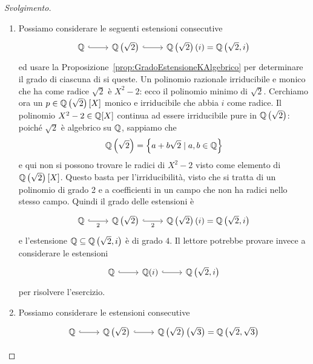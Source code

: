 \begin{proof}[Svolgimento]
\begin{enumerate}
\item Possiamo considerare le seguenti estensioni consecutive
\[\begin{tikzcd}
\Q \ar[r, hookrightarrow] & \Q\left(\sqrt 2\right) \ar[r, hookrightarrow] &  \Q\left(\sqrt 2\right)(i) = \Q\left(\sqrt 2, i\right)
\end{tikzcd}\]
ed usare la Proposizione~\ref{prop:GradoEstensioneKAlgebrico} per determinare il grado di ciascuna di si queste. Un polinomio razionale irriducibile e monico che ha come radice \(\sqrt2\) è \(X^2-2\): ecco il polinomio minimo di \(\sqrt2\). Cerchiamo ora un \(p \in \mathbb{Q}\left(\sqrt2\right) [X]\) monico e irriducibile che abbia \(i\) come radice. Il polinomio \(X^2-2 \in \mathbb{Q}[X]\) continua ad essere irriducibile pure in \(\mathbb{Q}\left(\sqrt2\right)\): poiché \(\sqrt 2\) è algebrico su \(\mathbb{Q}\), sappiamo che
\[\mathbb{Q}\left(\sqrt2\right) = \left\{ a+b\sqrt2 \mid a, b \in \mathbb{Q} \right\}\]
e qui non si possono trovare le radici di \(X^2-2\) visto come elemento di \(\mathbb{Q}\left(\sqrt2\right)[X]\). Questo basta per l'irriducibilità, visto che si tratta di un polinomio di grado 2 e a coefficienti in un campo che non ha radici nello stesso campo. Quindi il grado delle estensioni è
\[\begin{tikzcd}
\Q \ar["2", r, hookrightarrow, swap] & \Q\left(\sqrt 2\right) \ar["2", r, hookrightarrow, swap] &  \Q\left(\sqrt 2\right)(i) = \Q\left(\sqrt 2, i\right)
\end{tikzcd}\]
e l'estensione \(\mathbb{Q} \subseteq \mathbb{Q}\left(\sqrt 2, i\right)\) è di grado \(4\).
Il lettore potrebbe provare invece a considerare le estensioni
\[\begin{tikzcd}
\Q \ar[r, hookrightarrow] & \Q(i) \ar[r, hookrightarrow] & \Q\left(\sqrt 2, i\right)
\end{tikzcd}\]
per risolvere l'esercizio.
\item Possiamo considerare le estensioni consecutive
\[\begin{tikzcd}
\Q \ar[r, hookrightarrow] & \Q\left(\sqrt 2\right) \ar[r, hookrightarrow] &  \Q\left(\sqrt 2\right)\left(\sqrt 3\right) = \Q\left(\sqrt 2, \sqrt 3\right)

\end{tikzcd}\]
\end{enumerate}
\end{proof}
